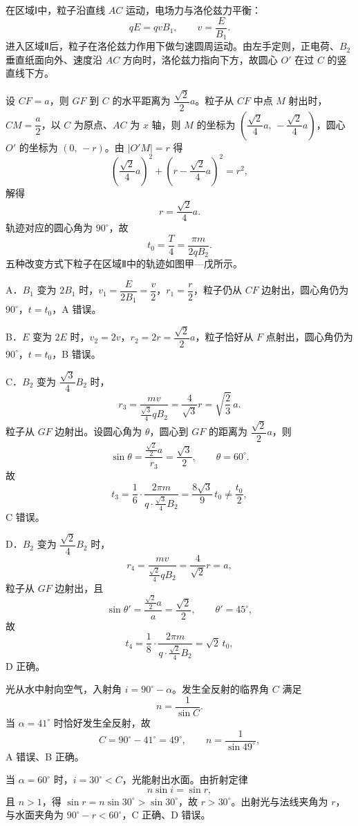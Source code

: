 \begin{answer}
在区域Ⅰ中，粒子沿直线 $AC$ 运动，电场力与洛伦兹力平衡：
\[
  qE=qvB_{1},\qquad v=\frac{E}{B_{1}}.
\]
进入区域Ⅱ后，粒子在洛伦兹力作用下做匀速圆周运动。由左手定则，正电荷、$B_{2}$ 垂直纸面向外、速度沿 $AC$ 方向时，洛伦兹力指向下方，故圆心 $O'$ 在过 $C$ 的竖直线下方。

设 $CF=a$，则 $GF$ 到 $C$ 的水平距离为 $\dfrac{\sqrt{2}}{2}a$。粒子从 $CF$ 中点 $M$ 射出时，$CM=\dfrac{a}{2}$，以 $C$ 为原点、$AC$ 为 $x$ 轴，则 $M$ 的坐标为 $\left(\dfrac{\sqrt{2}}{4}a,\,-\dfrac{\sqrt{2}}{4}a\right)$，圆心 $O'$ 的坐标为 $(0,\,-r)$。由 $|O'M|=r$ 得
\[
  \left(\frac{\sqrt{2}}{4}a\right)^{2}
  +\left(r-\frac{\sqrt{2}}{4}a\right)^{2}=r^{2},
\]
解得
\[
  r=\frac{\sqrt{2}}{4}a.
\]
轨迹对应的圆心角为 $90^{\circ}$，故
\[
  t_{0}=\frac{T}{4}=\frac{\pi m}{2qB_{2}}.
\]
五种改变方式下粒子在区域Ⅱ中的轨迹如图甲—戊所示。

A．$B_{1}$ 变为 $2B_{1}$ 时，$v_{1}=\dfrac{E}{2B_{1}}=\dfrac{v}{2}$，$r_{1}=\dfrac{r}{2}$，粒子仍从 $CF$ 边射出，圆心角仍为 $90^{\circ}$，$t=t_{0}$，A 错误。

B．$E$ 变为 $2E$ 时，$v_{2}=2v$，$r_{2}=2r=\dfrac{\sqrt{2}}{2}a$，粒子恰好从 $F$ 点射出，圆心角仍为 $90^{\circ}$，$t=t_{0}$，B 错误。

C．$B_{2}$ 变为 $\dfrac{\sqrt{3}}{4}B_{2}$ 时，
\[
  r_{3}=\frac{mv}{\frac{\sqrt{3}}{4}qB_{2}}=\frac{4}{\sqrt{3}}r=\sqrt{\frac{2}{3}}\,a.
\]
粒子从 $GF$ 边射出。设圆心角为 $\theta$，圆心到 $GF$ 的距离为 $\dfrac{\sqrt{2}}{2}a$，则
\[
  \sin\theta=\frac{\frac{\sqrt{2}}{2}a}{r_{3}}=\frac{\sqrt{3}}{2},
  \qquad \theta=60^{\circ}.
\]
故
\[
  t_{3}=\frac{1}{6}\cdot\frac{2\pi m}{q\cdot\frac{\sqrt{3}}{4}B_{2}}
      =\frac{8\sqrt{3}}{9}\,t_{0}\ne\frac{t_{0}}{2},
\]
C 错误。

D．$B_{2}$ 变为 $\dfrac{\sqrt{2}}{4}B_{2}$ 时，
\[
  r_{4}=\frac{mv}{\frac{\sqrt{2}}{4}qB_{2}}=\frac{4}{\sqrt{2}}r=a,
\]
粒子从 $GF$ 边射出，且
\[
  \sin\theta'=\frac{\frac{\sqrt{2}}{2}a}{a}=\frac{\sqrt{2}}{2},
  \qquad \theta'=45^{\circ},
\]
故
\[
  t_{4}=\frac{1}{8}\cdot\frac{2\pi m}{q\cdot\frac{\sqrt{2}}{4}B_{2}}
      =\sqrt{2}\,t_{0},
\]
D 正确。

\end{answer}

\begin{answer}
光从水中射向空气，入射角 $i=90^{\circ}-\alpha$。发生全反射的临界角 $C$ 满足
\[
  n=\frac{1}{\sin C}.
\]
当 $\alpha=41^{\circ}$ 时恰好发生全反射，故
\[
  C=90^{\circ}-41^{\circ}=49^{\circ},\qquad n=\frac{1}{\sin49^{\circ}},
\]
A 错误、B 正确。

当 $\alpha=60^{\circ}$ 时，$i=30^{\circ}<C$，光能射出水面。由折射定律
\[
  n\sin i=\sin r,
\]
且 $n>1$，得 $\sin r=n\sin30^{\circ}>\sin30^{\circ}$，故 $r>30^{\circ}$。出射光与法线夹角为 $r$，与水面夹角为 $90^{\circ}-r<60^{\circ}$，C 正确、D 错误。

\end{answer}

